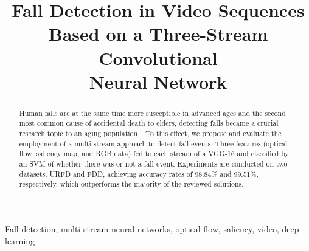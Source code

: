\documentclass[conference]{IEEEtran}
\begin{document}
\title{Fall Detection in Video Sequences\\ Based on a Three-Stream Convolutional\\ Neural Network}


\maketitle

\begin{abstract}
Human falls are at the same time more susceptible in advanced ages and the second most common cause of accidental death to elders, detecting falls became a crucial research topic to an aging population~\cite{who2007report}. To this effect, we propose and evaluate the employment of a multi-stream approach to detect fall events. Three features (optical flow, saliency map, and RGB data) fed to each stream of a VGG-16 and classified by an SVM of whether there was or not a fall event. Experiments are conducted on two datasets, URFD and FDD, achieving accuracy rates of 98.84\% and 99.51\%, respectively, which outperforms the majority of the reviewed solutions.
\end{abstract}

\begin{IEEEkeywords}
Fall detection, multi-stream neural networks, optical flow, saliency, video, deep learning
\end{IEEEkeywords}
\end{document}
